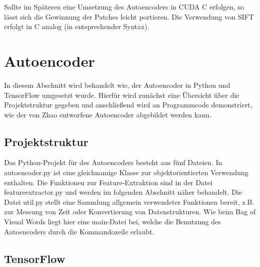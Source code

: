 
Sollte im Späteren eine Umsetzung des Autoencoders in CUDA C erfolgen, so lässt sich die Gewinnung der Patches leicht portieren. Die Verwendung von SIFT erfolgt in C analog (in entsprechender Syntax).

\section{Autoencoder}

In diesem Abschnitt wird behandelt wie, der Autoencoder in Python und TensorFlow umgesetzt wurde. Hierfür wird zunächst eine Übersicht über die Projektstruktur gegeben und anschließend wird an Programmcode demonstriert, wie der von Zhao entworfene Autoencoder abgebildet werden kann.

\subsection{Projektstruktur} Das Python-Projekt für des Autoencoders besteht aus fünf Dateien. In autoencoder.py ist eine gleichnamige Klasse zur objektorientierten Verwendung enthalten. Die Funktionen zur Feature-Extraktion sind in der Datei feature\textunderscore extractor.py und werden im folgenden Abschnitt näher behandelt. Die Datei util.py stellt eine Sammlung allgemein verwendeter Funktionen bereit, z.B. zur Messung von Zeit oder Konvertierung von Datenstrukturen. Wie beim Bag of Visual Words liegt hier eine main-Datei bei, welche die Benutzung des Autoencoders durch die Kommandozeile erlaubt.


\subsection{TensorFlow}

